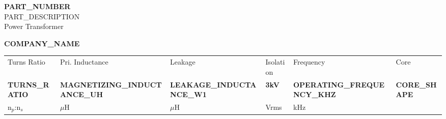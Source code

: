\documentclass[10pt,a4paper]{article}
\begin{document}

\vspace*{-8mm}
\begin{minipage}[t]{0.65\textwidth}
    \color{white}
    {\fontsize{24}{28}\selectfont\bfseries {{PART_NUMBER}}}\\[3mm]
    {\large {{PART_DESCRIPTION}}}\\[1mm]
    {\normalsize Power Transformer}
\end{minipage}
\hfill
\begin{minipage}[t]{0.30\textwidth}
    \raggedleft
    \color{white}
    {\large\bfseries {{COMPANY_NAME}}}\\[2mm]
\end{minipage}

\vspace{10mm}

\begin{tcolorbox}[
    colback=lightbg,
    colframe=primary,
    boxrule=0.5pt,
    arc=2mm,
    left=4mm,
    right=4mm,
    top=3mm,
    bottom=3mm
]
\centering
\renewcommand{\arraystretch}{1.4}
\begin{tabular}{C{28mm}C{28mm}C{28mm}C{28mm}C{28mm}C{28mm}}
    \textcolor{textmuted}{\footnotesize Turns Ratio} & 
    \textcolor{textmuted}{\footnotesize Pri. Inductance} & 
    \textcolor{textmuted}{\footnotesize Leakage} & 
    \textcolor{textmuted}{\footnotesize Isolation} &
    \textcolor{textmuted}{\footnotesize Frequency} & 
    \textcolor{textmuted}{\footnotesize Core} \\
    {\Large\bfseries\color{primary} {{TURNS_RATIO}}} & 
    {\Large\bfseries\color{primary} {{MAGNETIZING_INDUCTANCE_UH}}} & 
    {\Large\bfseries\color{primary} {{LEAKAGE_INDUCTANCE_W1}}} & 
    {\Large\bfseries\color{primary} 3kV} &
    {\Large\bfseries\color{primary} {{OPERATING_FREQUENCY_KHZ}}} & 
    {\Large\bfseries\color{primary} {{CORE_SHAPE}}} \\
    \textcolor{textmuted}{\footnotesize n$_p$:n$_s$} & 
    \textcolor{textmuted}{\footnotesize $\mu$H} & 
    \textcolor{textmuted}{\footnotesize $\mu$H} & 
    \textcolor{textmuted}{\footnotesize Vrms} &
    \textcolor{textmuted}{\footnotesize kHz} & 
    \textcolor{textmuted}{\footnotesize} \\
\end{tabular}
\end{tcolorbox}
\end{document}
